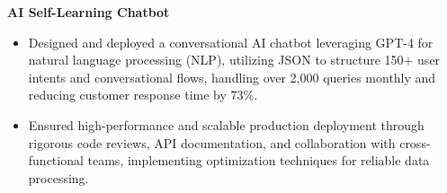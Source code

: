 \documentclass[a4paper,10pt]{article}
\begin{document}
\vspace{-2mm}
\textbf{AI Self-Learning Chatbot} \\
\begin{itemize}[leftmargin=*, itemsep=0pt, parsep=1pt]
\vspace{-7mm}
    \item Designed and deployed a conversational AI chatbot leveraging GPT-4 for natural language processing (NLP), utilizing JSON to structure 150+ user intents and conversational flows, handling over 2,000 queries monthly and reducing customer response time by 73\%.
    \item Ensured high-performance and scalable production deployment through rigorous code reviews, API documentation, and collaboration with cross-functional teams, implementing optimization techniques for reliable data processing.
\end{itemize}

\vspace{-2mm}
\end{document}
